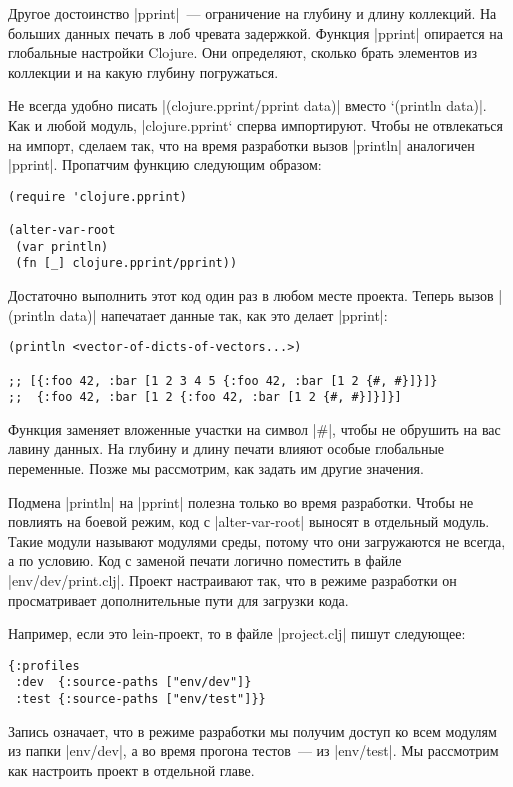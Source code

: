 Другое достоинство \spverb|pprint|~--- ограничение на глубину и длину коллекций. На
больших данных печать в лоб чревата задержкой. Функция \spverb|pprint| опирается на
глобальные настройки Clojure. Они определяют, сколько брать элементов из
коллекции и на какую глубину погружаться.

Не всегда удобно писать \spverb|(clojure.pprint/pprint data)| вместо `(println
data)\spverb|. Как и любой модуль, |clojure.pprint` сперва импортируют. Чтобы не
отвлекаться на импорт, сделаем так, что на время разработки вызов \spverb|println|
аналогичен \spverb|pprint|. Пропатчим функцию следующим образом:

\begin{verbatim}
(require 'clojure.pprint)

(alter-var-root
 (var println)
 (fn [_] clojure.pprint/pprint))
\end{verbatim}

Достаточно выполнить этот код один раз в любом месте проекта. Теперь вызов
\spverb|(println data)| напечатает данные так, как это делает \spverb|pprint|:

\begin{verbatim}
(println <vector-of-dicts-of-vectors...>)

;; [{:foo 42, :bar [1 2 3 4 5 {:foo 42, :bar [1 2 {#, #}]}]}
;;  {:foo 42, :bar [1 2 {:foo 42, :bar [1 2 {#, #}]}]}]
\end{verbatim}

Функция заменяет вложенные участки на символ \spverb|#|, чтобы не обрушить на вас лавину
данных. На глубину и длину печати влияют особые глобальные переменные. Позже мы
рассмотрим, как задать им другие значения.

Подмена \spverb|println| на \spverb|pprint| полезна только во время разработки. Чтобы не
повлиять на боевой режим, код с \spverb|alter-var-root| выносят в отдельный
модуль. Такие модули называют модулями среды, потому что они загружаются не
всегда, а по условию. Код с заменой печати логично поместить в файле
\spverb|env/dev/print.clj|. Проект настраивают так, что в режиме разработки он
просматривает дополнительные пути для загрузки кода.

Например, если это lein-проект, то в файле \spverb|project.clj| пишут следующее:

\begin{verbatim}
{:profiles
 :dev  {:source-paths ["env/dev"]}
 :test {:source-paths ["env/test"]}}
\end{verbatim}

Запись означает, что в режиме разработки мы получим доступ ко всем модулям из
папки \spverb|env/dev|, а во время прогона тестов~--- из \spverb|env/test|. Мы рассмотрим как
настроить проект в отдельной главе.

